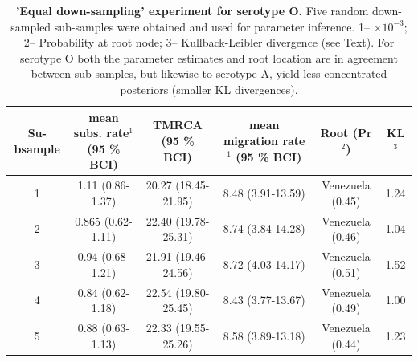 \documentclass[a4paper,10pt]{article}
\begin{document}
\newpage
\begin{table}
\medskip
\begin{minipage}{\textwidth}
\begin{center}
 \caption{ {{\bf 'Equal down-sampling' experiment for serotype O.}} 
 Five random down-sampled sub-samples were obtained and used for parameter inference.
1-- $\times 10^{-3}$; 2--  Probability at root node; 3-- Kullback-Leibler divergence (see Text).
For serotype O both the parameter estimates and root location are in agreement between sub-samples, but likewise to serotype A, yield less concentrated posteriors (smaller KL divergences).}
\begin{tabular}{cccccc}
\toprule
Su-bsample	&mean subs. rate$^{1}$ (95 \% BCI)	&TMRCA (95 \% BCI)	&mean migration rate$^{1}$ (95 \% BCI)	&Root (Pr$^{2}$) & KL$^3$\\
\midrule
1	&1.11 (0.86-1.37)	&20.27 (18.45-21.95)	&8.48 (3.91-13.59)	&Venezuela  (0.45)& 1.24\\
2	&0.865 (0.62-1.11)	&22.40 (19.78-25.31)	&8.74 (3.84-14.28)	&Venezuela  (0.46)&1.04\\
3	&0.94 (0.68-1.21)	&21.91 (19.46-24.56)	&8.72 (4.03-14.17)	&Venezuela  (0.51)&1.52\\
4	&0.84 (0.62-1.18)	&22.54 (19.80-25.45)	&8.43 (3.77-13.67)	&Venezuela  (0.49)&1.00\\
5	&0.88 (0.63-1.13)	&22.33 (19.55-25.26)	&8.58 (3.89-13.18)	&Venezuela  (0.44)&1.23\\
\bottomrule
\end{tabular}
\label{stab:ED_O}
\end{center}
\end{minipage}
\end{table}
\end{document}

